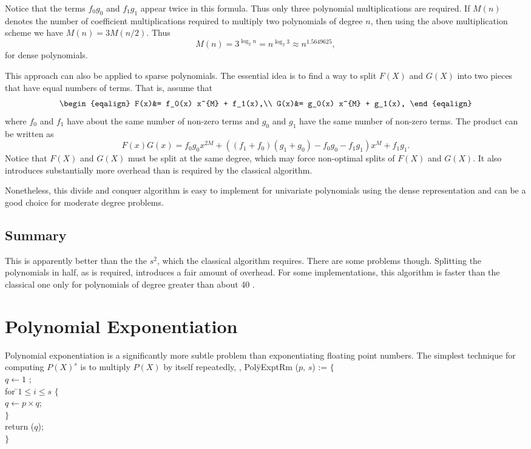 Notice that the terms $f_0 g_0$ and $f_1 g_1$ appear twice in this formula.
Thus only three polynomial multiplications are required.  If $M(n)$ denotes
the number of coefficient multiplications required to multiply two
polynomials of degree $n$, then using the above multiplication scheme we
have $M(n) = 3 M(n/2)$.  Thus
\[
M(n) = 3 ^{\log_2 n} = n^{\log_2 3} \approx n^{1.5649625},
\]
for dense polynomials.  

This approach can also be applied to sparse polynomials.  The
essential idea is to find a way to split $F(X)$ and $G(X)$ into two
pieces that have equal numbers of terms.  That is, assume that
\[
\begin{eqalign}
F(x)&= f_0(x) x^{M} + f_1(x),\\
G(x)&= g_0(x) x^{M} + g_1(x),
\end{eqalign}
\]
where $f_0$ and $f_1$ have about the same number of non-zero terms and
$g_0$ and $g_1$ have the same number of non-zero terms.  The product
can be written as
\[
  F(x) G(x) = f_0 g_0 x^{2M} 
       + ((f_1 + f_0) (g_1 + g_0) - f_0 g_0 - f_1 g_1) x^{M}
       + f_1 g_1.
\]
Notice that $F(X)$ and $G(X)$ must be split at the same degree, which
may force non-optimal splits of  $F(X)$ and $G(X)$.  It also
introduces substantially more overhead than is required by the
classical algorithm.  

Nonetheless, this divide and conquer algorithm is easy to implement
for univariate polynomials using the dense representation and can be a
good choice for moderate degree problems.  

\subsection{Summary}


This is apparently better than the the $s^2$, which the
classical algorithm requires.  There are some problems though.
Splitting the polynomials in half, as is required, introduces a fair
amount of overhead.  For some implementations, this algorithm is
faster than the classical one only for polynomials of degree greater
than about 40 \cite{Fateman74a}.


\section{Polynomial Exponentiation}
\label{Poly:Expt:Sec}

Polynomial exponentiation is a significantly more subtle problem than
exponentiating floating point numbers.  The simplest technique for
computing $P(X)^s$ is to multiply $P(X)$ by itself repeatedly, \ie,
\begindsacode
Pol\=yExptRm ($p$, $s$) := $\{$\\
\> $q \leftarrow 1$ ; \\
\> for \=$1 \le i \le s$ $\{$\\
\> \> $q \leftarrow p \times q$; \\
\>\> $\}$ \\
\> return ($q$); \\
\>$\}$
\enddsacode

